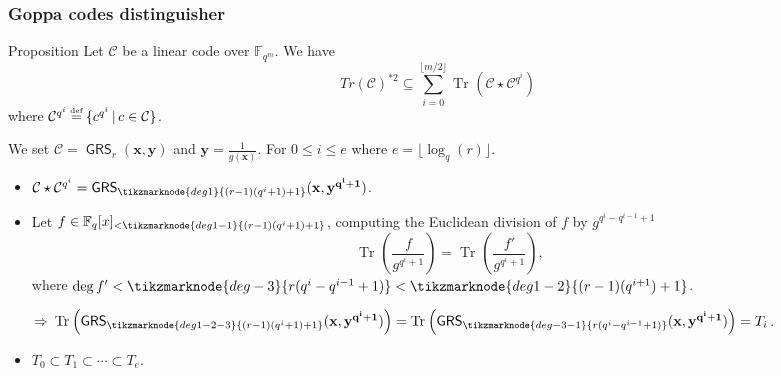 \documentclass[
10pt, %
%
aspectratio=169, %
]{beamer}
\theoremstyle{plain}%
\theoremstyle{definition}
\theoremstyle{remark}
\newcommand{\calC}{\mathcal{C}}
\newcommand{\fqm}{\mathbb{F}_{q^m}}
\newcommand{\fq}{\mathbb{F}_{q}}
\newcommand{\Tr}[1]{\operatorname{Tr}_{}\left(#1\right)}
\newcommand{\GRS}{\operatorname{\mathsf{GRS}}}
\newcommand\myeq{\mathrel{\stackrel{\makebox[0pt]{\mbox{\normalfont\tiny def}}}{=}}}
\newcommand\highlightnode[2]{ %
	\node (#1-frame)[rounded corners,fit=(#1),inner sep=2pt,fill=#2,fill opacity=0.17] {};
}
\begin{document}
\begin{frame}
	\frametitle{Goppa codes distinguisher \cite{MT21}}
	\begin{block}{Proposition \cite{MT21}}
		Let $\calC$ be a linear code over $\fqm$. We have
		\vspace{-0.9em}
		$$Tr(\calC)^{*2}\subseteq \sum\limits_{i=0}^{\lfloor{m/2} \rfloor} \Tr{\calC\star \calC^{q^i}}$$
		where $\calC^{q^i} \myeq \{c^{q^i} \,| \, c \in \calC \}  $.
	\end{block}
	We set $\calC = \GRS_r(\mathbf{x},\mathbf{y})$ and $\mathbf{y}=\frac{1}{g(\mathbf{x})}$. For $0\leq i\leq e$ where $e=\lfloor \log_q(r)\rfloor$.
	\begin{itemize}
		\item $\calC\star \calC^{q^i}=\GRS_{\tikzmarknode{deg1}{(r-1)(q^i+1)+1}}(\mathbf{x},\mathbf{y^{q^i+1}})$.
		\item Let $f \in \fq[x]_{<\tikzmarknode{deg1-1}{(r-1)(q^i+1)+1}}$, computing the Euclidean division of $f$ by $g^{q^i -q^{i-1}+1}$
		\[ \Tr{\frac{f}{g^{q^i +1}}}=\Tr{\frac{f'}{g^{q^i +1}}},\]
		where $\deg f' <\tikzmarknode{deg-3}{r(q^i -q^{i-1}+1)} <\tikzmarknode{deg1-2}{(r-1)(q^{i
			+1})+1}$.
		
		$\Rightarrow \: \Tr{\GRS_{\tikzmarknode{deg1-2-3}{(r-1)(q^i+1)+1}}(\mathbf{x},\mathbf{y^{q^i+1}})} = \Tr{\GRS_{\tikzmarknode{deg-3-1}{r(q^i -q^{i-1}+1)}}(\mathbf{x},\mathbf{y^{q^i+1}})} = T_i$.
		\item $T_0 \subset T_{1} \subset \cdots \subset T_e$.
	\end{itemize}


\end{frame}
\end{document}
